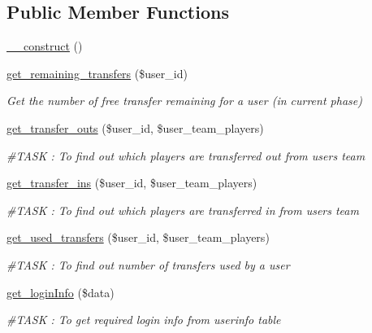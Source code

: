 \subsection*{Public Member Functions}
\begin{DoxyCompactItemize}
\item 
\hyperlink{class_user__model_a095c5d389db211932136b53f25f39685}{\+\_\+\+\_\+construct} ()
\item 
\hyperlink{class_user__model_a809db9cb3747c310ea13402ab5cb11d4}{get\+\_\+remaining\+\_\+transfers} (\$user\+\_\+id)
\begin{DoxyCompactList}\small\item\em Get the number of free transfer remaining for a user (in current phase) \end{DoxyCompactList}\item 
\hyperlink{class_user__model_ac031a6f376397815b01318081cedebb8}{get\+\_\+transfer\+\_\+outs} (\$user\+\_\+id, \$user\+\_\+team\+\_\+players)
\begin{DoxyCompactList}\small\item\em \#\+T\+A\+S\+K \+: To find out which players are transferred out from user\textquotesingle{}s team \end{DoxyCompactList}\item 
\hyperlink{class_user__model_a77b8bf0588f557fac2faa0c4cd39faec}{get\+\_\+transfer\+\_\+ins} (\$user\+\_\+id, \$user\+\_\+team\+\_\+players)
\begin{DoxyCompactList}\small\item\em \#\+T\+A\+S\+K \+: To find out which players are transferred in from user\textquotesingle{}s team \end{DoxyCompactList}\item 
\hyperlink{class_user__model_a3dd5f140152891c2aeb1a5be063a772a}{get\+\_\+used\+\_\+transfers} (\$user\+\_\+id, \$user\+\_\+team\+\_\+players)
\begin{DoxyCompactList}\small\item\em \#\+T\+A\+S\+K \+: To find out number of transfers used by a user \end{DoxyCompactList}\item 
\hyperlink{class_user__model_a5f339cfcda0ea331041ada24a74dcb16}{get\+\_\+login\+Info} (\$data)
\begin{DoxyCompactList}\small\item\em \#\+T\+A\+S\+K \+: To get required login info from userinfo table \end{DoxyCompactList}\item 

\end{DoxyCompactItemize}
